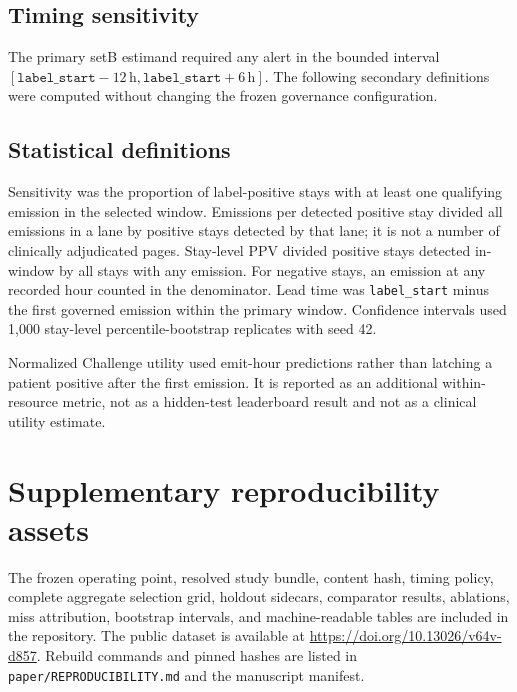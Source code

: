 \documentclass[11pt]{article}
\begin{document}
\subsection*{Timing sensitivity}
The primary setB estimand required any alert in the bounded interval
$[\texttt{label\_start}-12\,\mathrm{h},\texttt{label\_start}+6\,\mathrm{h}]$.
The following secondary definitions were computed without changing the frozen
governance configuration.

\begin{table}[htbp]
\centering\small
\caption{Supplementary Table S3. Secondary setB timing definitions.}

\end{table}

\subsection*{Statistical definitions}
Sensitivity was the proportion of label-positive stays with at least one
qualifying emission in the selected window. Emissions per detected positive
stay divided all emissions in a lane by positive stays detected by that lane;
it is not a number of clinically adjudicated pages. Stay-level PPV divided
positive stays detected in-window by all stays with any emission. For negative
stays, an emission at any recorded hour counted in the denominator. Lead time
was \texttt{label\_start} minus the first governed emission within the primary
window. Confidence intervals used 1,000 stay-level percentile-bootstrap
replicates with seed 42.

Normalized Challenge utility used emit-hour predictions rather than latching a
patient positive after the first emission. It is reported as an additional
within-resource metric, not as a hidden-test leaderboard result and not as a
clinical utility estimate.

\section*{Supplementary reproducibility assets}
The frozen operating point, resolved study bundle, content hash, timing policy,
complete aggregate selection grid, holdout sidecars, comparator results,
ablations, miss attribution, bootstrap intervals, and machine-readable tables
are included in the repository. The public dataset is available at
\url{https://doi.org/10.13026/v64v-d857}. Rebuild commands and pinned hashes are
listed in \texttt{paper/REPRODUCIBILITY.md} and the manuscript manifest.
\end{document}
